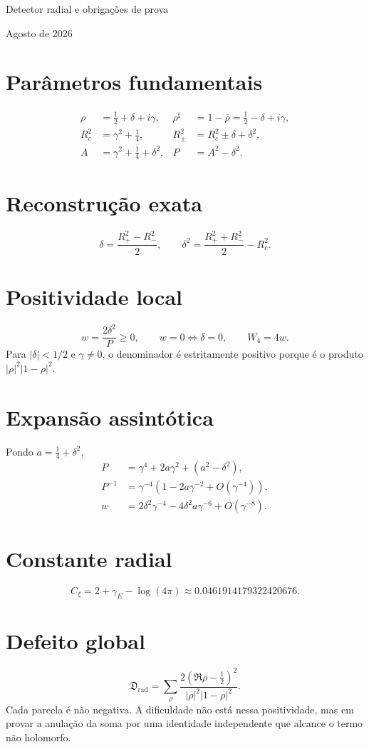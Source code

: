 \documentclass[11pt,a4paper]{article}
\newcommand{\Drad}{\mathfrak D_{\mathrm{rad}}}
\begin{document}
\begin{titlepage}\vfill{\Large Detector radial e obrigações de prova\par}\vfill Agosto de 2026\end{titlepage}
\section{Parâmetros fundamentais}
\begin{align*}
\rho&=\tfrac12+\delta+i\gamma,& \rho^\sharp&=1-\bar\rho=\tfrac12-\delta+i\gamma,\\
R_c^2&=\gamma^2+\tfrac14,& R_\pm^2&=R_c^2\pm\delta+\delta^2,\\
A&=\gamma^2+\tfrac14+\delta^2,& P&=A^2-\delta^2.
\end{align*}
\section{Reconstrução exata}
\[\delta=\frac{R_+^2-R_-^2}{2},\qquad \delta^2=\frac{R_+^2+R_-^2}{2}-R_c^2.\]
\section{Positividade local}
\[w=\frac{2\delta^2}{P}\ge0,\qquad w=0\Longleftrightarrow\delta=0,\qquad W_4=4w.\]
Para $|\delta|<1/2$ e $\gamma\ne0$, o denominador é estritamente positivo porque é o produto $|\rho|^2|1-\rho|^2$.
\section{Expansão assintótica}
Pondo $a=\tfrac14+\delta^2$,
\begin{align*}
P&=\gamma^4+2a\gamma^2+(a^2-\delta^2),\\
P^{-1}&=\gamma^{-4}\left(1-2a\gamma^{-2}+O(\gamma^{-4})\right),\\
w&=2\delta^2\gamma^{-4}-4\delta^2a\gamma^{-6}+O(\gamma^{-8}).
\end{align*}
\section{Constante radial}
\[C_\xi=2+\gamma_E-\log(4\pi)\approx0.0461914179322420676.\]
\section{Defeito global}
\[\Drad=\sum_\rho\frac{2(\Re\rho-\tfrac12)^2}{|\rho|^2|1-\rho|^2}.\]
Cada parcela é não negativa. A dificuldade não está nessa positividade, mas em provar a anulação da soma por uma identidade independente que alcance o termo não holomorfo.
\end{document}
